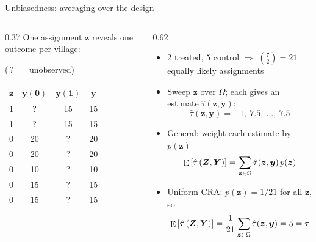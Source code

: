 \documentclass[table, xcolor = {dvipsnames}, 9pt]{beamer}
\theoremstyle{plain}
\DeclareMathOperator{\E}{\rm{E}}
\begin{document}
\begin{frame}[t]{Unbiasedness: averaging over the design}
\vfill
\begin{columns}[t]
\begin{column}{0.37\linewidth}
One assignment $\bm{z}$ reveals one outcome per village:
\begin{center}($\,?\,=$ unobserved)\end{center}
\begin{table}[H]
\scriptsize
\begin{tabular}{c|cc|c}
$\bm{z}$ & $\bm{y}(\bm{0})$ & $\bm{y}(\bm{1})$ & $\bm{y}$ \\ \midrule
1 & ?  & 15 & 15 \\
1 & ?  & 15 & 15 \\
0 & 20 & ?  & 20 \\
0 & 20 & ?  & 20 \\
0 & 10 & ?  & 10 \\
0 & 15 & ?  & 15 \\
0 & 15 & ?  & 15 \\
\end{tabular}
\end{table}
\end{column}
\begin{column}{0.62\linewidth}
\begin{itemize} \vfill
\item $2$ treated, $5$ control $\Rightarrow$ $\binom{7}{2} = 21$ equally likely assignments \vfill
\item Sweep $\bm{z}$ over $\Omega$; each gives an estimate $\hat{\tau}(\bm{z}, \bm{y})$:
\begin{equation*}
\hat{\tau}(\bm{z}, \bm{y}) = -1,\ 7.5,\ \ldots,\ 7.5
\end{equation*} \vfill
\item General: weight each estimate by $p(\bm{z})$
\begin{equation*}
\E\left[\hat{\tau}\left(\bm{Z}, \bm{Y}\right)\right] = \sum_{\bm{z} \in \Omega} \hat{\tau}(\bm{z}, \bm{y})\, p(\bm{z})
\end{equation*} \vfill
\item Uniform CRA: $p(\bm{z}) = 1/21$ for all $\bm{z}$, so
\begin{equation*}
\E\left[\hat{\tau}\left(\bm{Z}, \bm{Y}\right)\right] = \frac{1}{21}\sum_{\bm{z} \in \Omega} \hat{\tau}(\bm{z}, \bm{y}) = 5 = \bar{\tau}
\end{equation*} \vfill
\end{itemize}
\end{column}
\end{columns}
\vfill
\end{frame}
\end{document}
